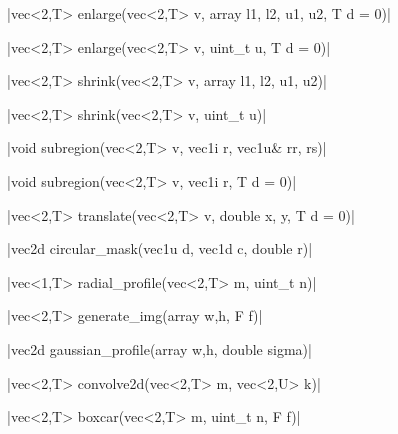 \funcitem \cppinline|vec<2,T> enlarge(vec<2,T> v, array {l1, l2, u1, u2}, T d = 0)| 

\cppinline|vec<2,T> enlarge(vec<2,T> v, uint_t u, T d = 0)|

\funcitem \cppinline|vec<2,T> shrink(vec<2,T> v, array {l1, l2, u1, u2})| 

\cppinline|vec<2,T> shrink(vec<2,T> v, uint_t u)|

\funcitem \cppinline|void subregion(vec<2,T> v, vec1i r, vec1u& rr, rs)| 

\cppinline|void subregion(vec<2,T> v, vec1i r, T d = 0)|

\funcitem \cppinline|vec<2,T> translate(vec<2,T> v, double x, y, T d = 0)| 

\funcitem \cppinline|vec2d circular_mask(vec1u d, vec1d c, double r)| 

\funcitem \cppinline|vec<1,T> radial_profile(vec<2,T> m, uint_t n)| 

\funcitem \cppinline|vec<2,T> generate_img(array {w,h}, F f)| 

\funcitem \cppinline|vec2d gaussian_profile(array {w,h}, double sigma)| 

\funcitem \cppinline|vec<2,T> convolve2d(vec<2,T> m, vec<2,U> k)| 

\funcitem \cppinline|vec<2,T> boxcar(vec<2,T> m, uint_t n, F f)| 
